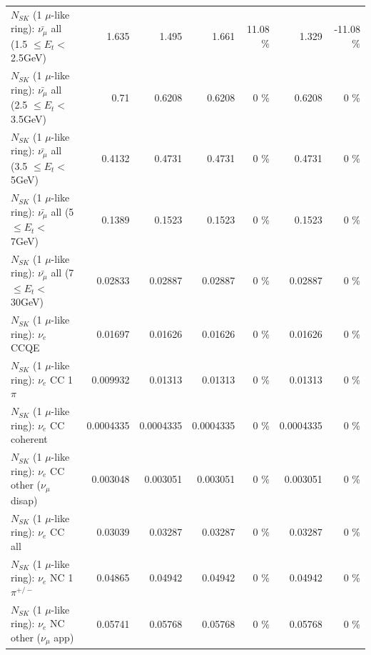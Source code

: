 \begin{table}
\begin{tabular}{| l | r | r | r  r | r  r |}
 $N_{SK}$ (1 $\mu$-like ring): $\bar{\nu_{\mu}}$ all (1.5 $\leq E_{t} <$ 2.5GeV) &           1.635 &           1.495 &           1.661 &    11.08 \%  &           1.329 &   -11.08 \%  \\ 
 $N_{SK}$ (1 $\mu$-like ring): $\bar{\nu_{\mu}}$ all (2.5 $\leq E_{t} <$ 3.5GeV) &            0.71 &          0.6208 &          0.6208 &        0 \%  &          0.6208 &        0 \%  \\ 
   $N_{SK}$ (1 $\mu$-like ring): $\bar{\nu_{\mu}}$ all (3.5 $\leq E_{t} <$ 5GeV) &          0.4132 &          0.4731 &          0.4731 &        0 \%  &          0.4731 &        0 \%  \\ 
     $N_{SK}$ (1 $\mu$-like ring): $\bar{\nu_{\mu}}$ all (5 $\leq E_{t} <$ 7GeV) &          0.1389 &          0.1523 &          0.1523 &        0 \%  &          0.1523 &        0 \%  \\ 
    $N_{SK}$ (1 $\mu$-like ring): $\bar{\nu_{\mu}}$ all (7 $\leq E_{t} <$ 30GeV) &         0.02833 &         0.02887 &         0.02887 &        0 \%  &         0.02887 &        0 \%  \\ 
\hline
\hline
\hline
                                      $N_{SK}$ (1 $\mu$-like ring): $\nu_e$ CCQE &         0.01697 &         0.01626 &         0.01626 &        0 \%  &         0.01626 &        0 \%  \\ 
                                 $N_{SK}$ (1 $\mu$-like ring): $\nu_e$ CC 1$\pi$ &        0.009932 &         0.01313 &         0.01313 &        0 \%  &         0.01313 &        0 \%  \\ 
                               $N_{SK}$ (1 $\mu$-like ring): $\nu_e$ CC coherent &       0.0004335 &       0.0004335 &       0.0004335 &        0 \%  &       0.0004335 &        0 \%  \\ 
                $N_{SK}$ (1 $\mu$-like ring): $\nu_e$ CC other ($\nu_\mu$ disap) &        0.003048 &        0.003051 &        0.003051 &        0 \%  &        0.003051 &        0 \%  \\ 
                                  $N_{SK}$ (1 $\mu$-like ring): $\nu_{e}$ CC all &         0.03039 &         0.03287 &         0.03287 &        0 \%  &         0.03287 &        0 \%  \\ 
\hline
                           $N_{SK}$ (1 $\mu$-like ring): $\nu_e$ NC 1$\pi^{+/-}$ &         0.04865 &         0.04942 &         0.04942 &        0 \%  &         0.04942 &        0 \%  \\ 
                  $N_{SK}$ (1 $\mu$-like ring): $\nu_e$ NC other ($\nu_\mu$ app) &         0.05741 &         0.05768 &         0.05768 &        0 \%  &         0.05768 &        0 \%  \\ 

\end{tabular}
\end{table}
